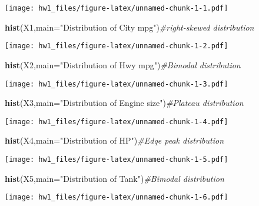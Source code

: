 \documentclass[
]{article}
\newenvironment{Shaded}{\begin{snugshade}}{\end{snugshade}}
\newcommand{\CommentTok}[1]{\textcolor[rgb]{0.56,0.35,0.01}{\textit{#1}}}
\newcommand{\DataTypeTok}[1]{\textcolor[rgb]{0.13,0.29,0.53}{#1}}
\newcommand{\KeywordTok}[1]{\textcolor[rgb]{0.13,0.29,0.53}{\textbf{#1}}}
\newcommand{\NormalTok}[1]{#1}
\newcommand{\StringTok}[1]{\textcolor[rgb]{0.31,0.60,0.02}{#1}}
\begin{document}
\texttt{[image: hw1\_files/figure-latex/unnamed-chunk-1-1.pdf]}

\begin{Shaded}
\begin{Highlighting}[]
\KeywordTok{hist}\NormalTok{(X1,}\DataTypeTok{main=}\StringTok{"Distribution of City mpg"}\NormalTok{)}\CommentTok{#right-skewed distribution }
\end{Highlighting}
\end{Shaded}

\texttt{[image: hw1\_files/figure-latex/unnamed-chunk-1-2.pdf]}

\begin{Shaded}
\begin{Highlighting}[]
\KeywordTok{hist}\NormalTok{(X2,}\DataTypeTok{main=}\StringTok{"Distribution of Hwy mpg"}\NormalTok{)}\CommentTok{#Bimodal distribution}
\end{Highlighting}
\end{Shaded}

\texttt{[image: hw1\_files/figure-latex/unnamed-chunk-1-3.pdf]}

\begin{Shaded}
\begin{Highlighting}[]
\KeywordTok{hist}\NormalTok{(X3,}\DataTypeTok{main=}\StringTok{"Distribution of Engine size"}\NormalTok{)}\CommentTok{#Plateau distribution  }
\end{Highlighting}
\end{Shaded}

\texttt{[image: hw1\_files/figure-latex/unnamed-chunk-1-4.pdf]}

\begin{Shaded}
\begin{Highlighting}[]
\KeywordTok{hist}\NormalTok{(X4,}\DataTypeTok{main=}\StringTok{"Distribution of HP"}\NormalTok{)}\CommentTok{#Edqe peak distribution}
\end{Highlighting}
\end{Shaded}

\texttt{[image: hw1\_files/figure-latex/unnamed-chunk-1-5.pdf]}

\begin{Shaded}
\begin{Highlighting}[]
\KeywordTok{hist}\NormalTok{(X5,}\DataTypeTok{main=}\StringTok{"Distribution of Tank"}\NormalTok{)}\CommentTok{#Bimodal distribution}
\end{Highlighting}
\end{Shaded}

\texttt{[image: hw1\_files/figure-latex/unnamed-chunk-1-6.pdf]}
\end{document}
